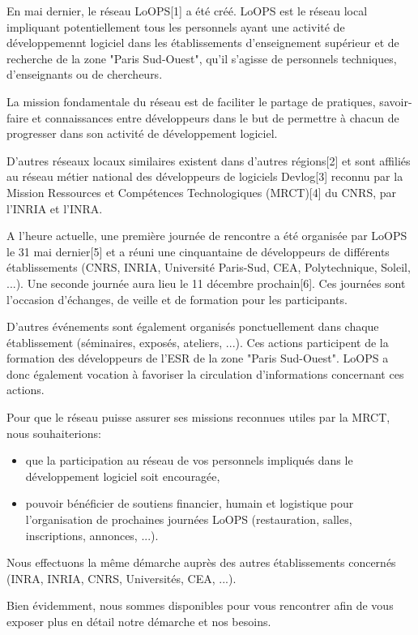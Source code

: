 En mai dernier, le réseau LoOPS[1] a été créé. LoOPS est le réseau local
impliquant potentiellement tous les personnels ayant une activité de
développemennt logiciel dans les établissements d'enseignement supérieur
et de recherche de la zone "Paris Sud-Ouest", qu'il s'agisse de personnels
techniques, d'enseignants ou de chercheurs.

La mission fondamentale du réseau est de faciliter le partage de pratiques,
savoir-faire et connaissances entre développeurs dans le but de permettre à
chacun de progresser dans son activité de développement logiciel.

D'autres réseaux locaux similaires existent dans d'autres régions[2]
et sont affiliés au réseau métier national des développeurs de logiciels
Devlog[3] reconnu par la Mission Ressources et Compétences Technologiques
(MRCT)[4] du CNRS, par l'INRIA et l'INRA.

A l'heure actuelle, une première journée de rencontre a été organisée par
LoOPS le 31 mai dernier[5] et a réuni une cinquantaine de développeurs de
différents établissements (CNRS, INRIA, Université Paris-Sud, CEA,
Polytechnique, Soleil, ...). Une seconde journée aura lieu le 11 décembre
prochain[6]. Ces journées sont l'occasion d'échanges, de veille et de
formation pour les participants.

D'autres événements sont également organisés ponctuellement dans chaque
établissement (séminaires, exposés, ateliers, ...). Ces actions participent
de la formation des développeurs de l'ESR de la zone "Paris Sud-Ouest". LoOPS
a donc également vocation à favoriser la circulation d'informations concernant
ces actions.

Pour que le réseau puisse assurer ses missions reconnues utiles par la MRCT,
nous souhaiterions:
\begin{itemize}
\item que la participation au réseau de vos personnels impliqués dans le
  développement logiciel soit encouragée,
\item pouvoir bénéficier de soutiens financier, humain et logistique pour
  l'organisation de prochaines journées LoOPS (restauration, salles,
  inscriptions, annonces, ...).
\end{itemize}

Nous effectuons la même démarche auprès des autres établissements concernés
(INRA, INRIA, CNRS, Universités, CEA, ...).

Bien évidemment, nous sommes disponibles pour vous rencontrer afin de vous
exposer plus en détail notre démarche et nos besoins.
